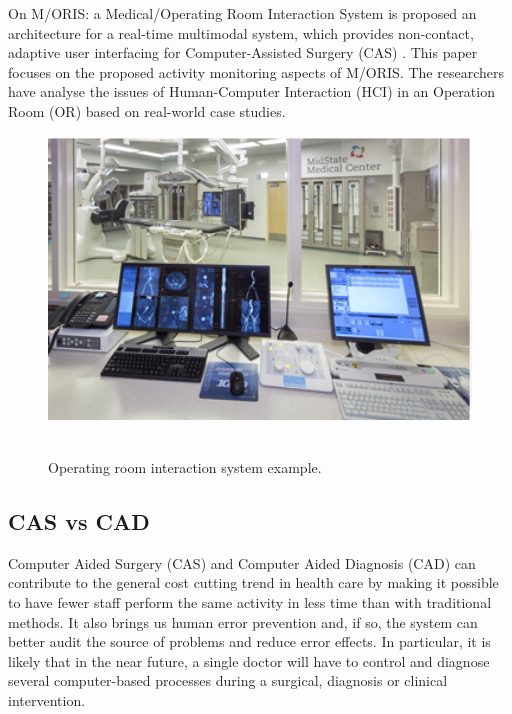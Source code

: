 On M/ORIS: a Medical/Operating Room Interaction System \cite{grange2004m} is proposed an architecture for a real-time multimodal system, which provides non-contact, adaptive user interfacing for Computer-Assisted Surgery (CAS) \cite{hahn2001visualization}. This paper focuses on the proposed activity monitoring aspects of M/ORIS. The researchers have analyse the issues of Human-Computer Interaction (HCI) in an Operation Room (OR) based on real-world case studies.

\begin{figure}[!hbt]
\centering
\includegraphics[width=15cm]{images/moris}~\\
\caption{\label{fig:moris}Operating room interaction system example.
}
\end{figure}

\subsection{CAS vs CAD}

Computer Aided Surgery (CAS) \cite{wikipedia2016computerassisted} and Computer Aided Diagnosis (CAD) \cite{wikipedia2016computeraided} can contribute to the general cost cutting trend in health care by making it possible to have fewer staff perform the same activity in less time than with traditional methods. It also brings us human error prevention and, if so, the system can better audit the source of problems and reduce error effects. In particular, it is likely that in the near future, a single doctor will have to control and diagnose several computer-based processes during a surgical, diagnosis or clinical intervention.

